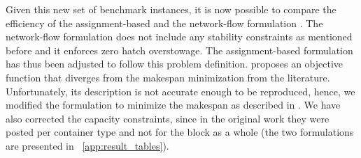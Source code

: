 \documentclass[preprint,12pt,authoryear]{elsarticle}
\begin{document}
Given this new set of benchmark instances, it is now possible to compare the efficiency of the assignment-based  \citep{Pacino2011FastVessels} and the network-flow formulation \citep{Chao2021}. The network-flow formulation does not include any stability constraints as mentioned before and it enforces zero hatch overstowage. The assignment-based formulation has thus been adjusted to follow this problem definition. \cite{Chao2021} proposes an objective function that diverges from the makespan minimization from the literature. Unfortunately, its description is not accurate enough to be reproduced, hence, we modified the formulation to minimize the makespan as described in \cite{Pacino2011FastVessels}. We have also corrected the capacity constraints, since in the original work they were posted per container type and not for the block as a whole (the two formulations are presented in ~\ref{app:result_tables}).
\end{document}
